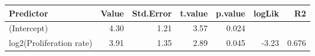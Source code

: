 \begin{table}[ht]
\centering
\begin{tabular}{lrrrrrr}
  \hline
Predictor & Value & Std.Error & t.value & p.value & logLik & R2 \\ 
  \hline
(Intercept) & 4.30 & 1.21 & 3.57 & 0.024 &  &  \\ 
  log2(Proliferation rate) & 3.91 & 1.35 & 2.89 & 0.045 & -3.23 & 0.676 \\ 
   \hline
\end{tabular}
\end{table}
